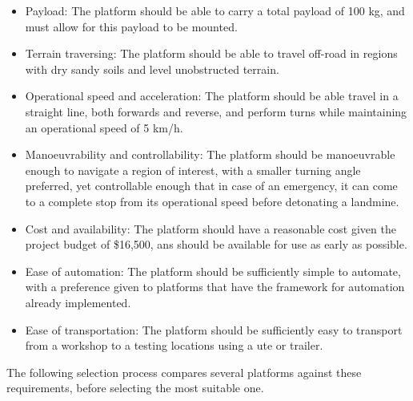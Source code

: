 \documentclass[main.tex]{subfiles}
\begin{document}
\begin{appendices}
\begin{itemize}
 \item Payload: The platform should be able to carry a total payload of 100 kg, and must allow for this payload to be mounted.
 \item Terrain traversing: The platform should be able to travel off-road in regions with dry sandy soils and level unobstructed terrain.
\item  Operational speed and acceleration: The platform should be able travel in a straight line, both forwards and reverse, and perform turns while maintaining an operational speed of 5 km/h.
\item Manoeuvrability and controllability: The platform should be manoeuvrable enough to navigate a region of interest, with a smaller turning angle preferred, yet controllable enough that in case of an emergency, it can come to a complete stop from its operational speed before detonating a landmine.
\item Cost and availability: The platform should have a reasonable cost given the project budget of \$16,500, ans should be available for use as early as possible. 
\item Ease of automation: The platform should be sufficiently simple to automate, with a preference given to platforms that have the framework for automation already implemented. 
\item Ease of transportation: The platform should be sufficiently easy to transport from a workshop to a testing locations using a ute or trailer.
\end{itemize}
The following selection process compares several platforms against these requirements, before selecting the most suitable one. 


\end{appendices}
\end{document}
